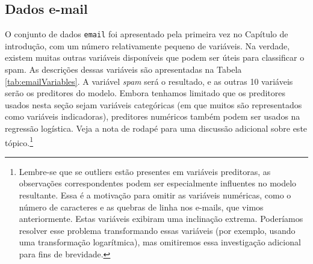 \documentclass[
]{book}
\theoremstyle{definition}
\theoremstyle{definition}
\theoremstyle{definition}
\theoremstyle{definition}
\theoremstyle{remark}
\begin{document}
\hypertarget{eMailData}{%
\subsection{Dados e-mail}\label{eMailData}}

O conjunto de dados \texttt{email} foi apresentado pela primeira vez no Capítulo de introdução, com um número relativamente pequeno de variáveis. Na verdade, existem muitas outras variáveis disponíveis que podem ser úteis para classificar o spam. As descrições dessas variáveis são apresentadas na Tabela \ref{tab:emailVariables}. A variável \emph{spam} será o resultado, e as outras 10 variáveis serão os preditores do modelo. Embora tenhamos limitado que os preditores usados nesta seção sejam variáveis categóricas (em que muitos são representados como variáveis indicadoras), preditores numéricos também podem ser usados na regressão logística. Veja a nota de rodapé para uma discussão adicional sobre este tópico.\footnote{Lembre-se que se outliers estão presentes em variáveis preditoras, as observações correspondentes podem ser especialmente influentes no modelo resultante. Essa é a motivação para omitir as variáveis numéricas, como o número de caracteres e as quebras de linha nos e-mails, que vimos anteriormente. Estas variáveis exibiram uma inclinação extrema. Poderíamos resolver esse problema transformando essas variáveis (por exemplo, usando uma transformação logarítmica), mas omitiremos essa investigação adicional para fins de brevidade.}
\end{document}
